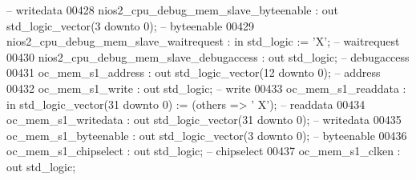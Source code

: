 \begin{DoxyCode}
           \textcolor{keyword}{-- writedata}
00428             nios2\_cpu\_debug\_mem\_slave\_byteenable        : \textcolor{keywordflow}{out} \textcolor{comment}{std\_logic\_vector}(\textcolor{vhdllogic}{}\textcolor{vhdllogic}{3} \textcolor{keywordflow}{downto} \textcolor{vhdllogic}{}\textcolor{vhdllogic}{0});                
           \textcolor{keyword}{-- byteenable}
00429             nios2\_cpu\_debug\_mem\_slave\_waitrequest       : \textcolor{keywordflow}{in}  \textcolor{comment}{std\_logic}                     := 'X';        
           \textcolor{keyword}{-- waitrequest}
00430             nios2\_cpu\_debug\_mem\_slave\_debugaccess       : \textcolor{keywordflow}{out} \textcolor{comment}{std\_logic};                                   
           \textcolor{keyword}{-- debugaccess}
00431             oc\_mem\_s1\_address                           : \textcolor{keywordflow}{out} \textcolor{comment}{std\_logic\_vector}(\textcolor{vhdllogic}{}\textcolor{vhdllogic}{12} \textcolor{keywordflow}{downto} \textcolor{vhdllogic}{}\textcolor{vhdllogic}{0});               
           \textcolor{keyword}{-- address}
00432             oc\_mem\_s1\_write                             : \textcolor{keywordflow}{out} \textcolor{comment}{std\_logic};                                   
           \textcolor{keyword}{-- write}
00433             oc\_mem\_s1\_readdata                          : \textcolor{keywordflow}{in}  \textcolor{comment}{std\_logic\_vector}(\textcolor{vhdllogic}{}\textcolor{vhdllogic}{31} \textcolor{keywordflow}{downto} \textcolor{vhdllogic}{}\textcolor{vhdllogic}{0}) := (\textcolor{keywordflow}{others} => '
      X'); \textcolor{keyword}{-- readdata}
00434             oc\_mem\_s1\_writedata                         : \textcolor{keywordflow}{out} \textcolor{comment}{std\_logic\_vector}(\textcolor{vhdllogic}{}\textcolor{vhdllogic}{31} \textcolor{keywordflow}{downto} \textcolor{vhdllogic}{}\textcolor{vhdllogic}{0});               
           \textcolor{keyword}{-- writedata}
00435             oc\_mem\_s1\_byteenable                        : \textcolor{keywordflow}{out} \textcolor{comment}{std\_logic\_vector}(\textcolor{vhdllogic}{}\textcolor{vhdllogic}{3} \textcolor{keywordflow}{downto} \textcolor{vhdllogic}{}\textcolor{vhdllogic}{0});                
           \textcolor{keyword}{-- byteenable}
00436             oc\_mem\_s1\_chipselect                        : \textcolor{keywordflow}{out} \textcolor{comment}{std\_logic};                                   
           \textcolor{keyword}{-- chipselect}
00437             oc\_mem\_s1\_clken                             : \textcolor{keywordflow}{out} \textcolor{comment}{std\_logic};                                   

\end{DoxyCode}
